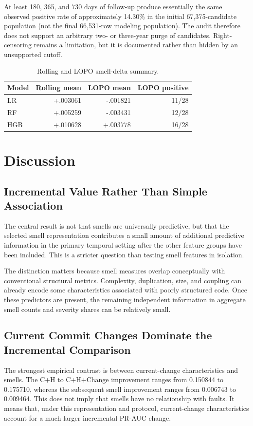 \documentclass[conference]{IEEEtran}
\begin{document}
At least 180, 365, and 730 days of follow-up produce essentially the same observed positive rate of approximately 14.30\% in the initial 67,375-candidate population (not the final 66,531-row modeling population). The audit therefore does not support an arbitrary two- or three-year purge of candidates. Right-censoring remains a limitation, but it is documented rather than hidden by an unsupported cutoff.

\begin{table}[t]
\centering
\caption{Rolling and LOPO smell-delta summary.}
\label{tab:stability}
\small
\begin{tabular}{lrrr}
\toprule
Model & Rolling mean & LOPO mean & LOPO positive\\
\midrule
LR & +.003061 & -.001821 & 11/28\\
RF & +.005259 & -.003431 & 12/28\\
HGB & +.010628 & +.003778 & 16/28\\
\bottomrule
\end{tabular}
\end{table}

\section{Discussion}
\subsection{Incremental Value Rather Than Simple Association}
The central result is not that smells are universally predictive, but that the selected smell representation contributes a small amount of additional predictive information in the primary temporal setting after the other feature groups have been included. This is a stricter question than testing smell features in isolation.

The distinction matters because smell measures overlap conceptually with conventional structural metrics. Complexity, duplication, size, and coupling can already encode some characteristics associated with poorly structured code. Once these predictors are present, the remaining independent information in aggregate smell counts and severity shares can be relatively small.

\subsection{Current Commit Changes Dominate the Incremental Comparison}
The strongest empirical contrast is between current-change characteristics and smells. The C+H to C+H+Change improvement ranges from 0.150844 to 0.175710, whereas the subsequent smell improvement ranges from 0.006743 to 0.009464. This does not imply that smells have no relationship with faults. It means that, under this representation and protocol, current-change characteristics account for a much larger incremental PR-AUC change.
\end{document}

